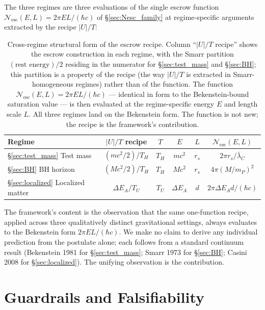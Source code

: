 \documentclass[11pt]{article}
\begin{document}
The three regimes are three evaluations of the single escrow function $\mathcal{N}_{\mathrm{esc}}(E, L) = 2\pi E L/(\hbar c)$ of \S\ref{sec:Nesc_family} at regime-specific arguments extracted by the recipe $|U|/T$:

\begin{table}[h]
\centering
\begin{tabular}{lccccc}
\toprule
Regime & $|U|/T$ recipe & $T$ & $E$ & $L$ & $\mathcal{N}_{\mathrm{esc}}(E,L)$ \\
\midrule
\S\ref{sec:test_mass} Test mass & $(mc^2/2)/T_H$ & $T_H$ & $mc^2$ & $r_s$ & $2\pi r_s/\bar{\lambda}_C$ \\
\S\ref{sec:BH} BH horizon & $(Mc^2/2)/T_H$ & $T_H$ & $Mc^2$ & $r_s$ & $4\pi(M/m_P)^2$ \\
\S\ref{sec:localized} Localized matter & $\Delta E_A/T_U$ & $T_U$ & $\Delta E_A$ & $d$ & $2\pi \Delta E_A d/(\hbar c)$ \\
\bottomrule
\end{tabular}
\caption{Cross-regime structural form of the escrow recipe. Column ``$|U|/T$ recipe'' shows the escrow construction in each regime, with the Smarr partition $(\text{rest~energy})/2$ residing in the numerator for \S\ref{sec:test_mass} and \S\ref{sec:BH}; this partition is a property of the recipe (the way $|U|/T$ is extracted in Smarr-homogeneous regimes) rather than of the function. The function $\mathcal{N}_{\mathrm{esc}}(E, L) = 2\pi E L/(\hbar c)$ — identical in form to the Bekenstein-bound saturation value — is then evaluated at the regime-specific energy $E$ and length scale $L$. All three regimes land on the Bekenstein form. The function is not new; the recipe is the framework's contribution.}
\label{tab:cross_regime}
\end{table}

The framework's content is the observation that the same one-function recipe, applied across three qualitatively distinct gravitational settings, always evaluates to the Bekenstein form $2\pi E L/(\hbar c)$. We make no claim to derive any individual prediction from the postulate alone; each follows from a standard continuum result (Bekenstein 1981 for \S\ref{sec:test_mass}; Smarr 1973 for \S\ref{sec:BH}; Casini 2008 for \S\ref{sec:localized}). The unifying observation is the contribution.

\section{Guardrails and Falsifiability}
\label{sec:guardrails}
\end{document}
